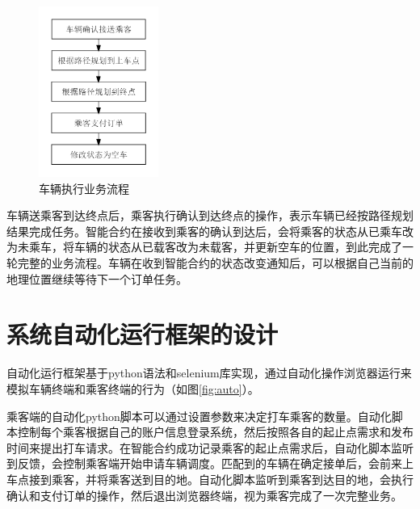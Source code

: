 \begin{figure}
  \centering
  \includegraphics[width=0.35\textwidth]{figures/按导航执行业务}
  \caption{车辆执行业务流程}\label{fig:routing}
\end{figure}

车辆送乘客到达终点后，乘客执行确认到达终点的操作，表示车辆已经按路径规划结果完成任务。智能合约在接收到乘客的确认到达后，会将乘客的状态从已乘车改为未乘车，将车辆的状态从已载客改为未载客，并更新空车的位置，到此完成了一轮完整的业务流程。车辆在收到智能合约的状态改变通知后，可以根据自己当前的地理位置继续等待下一个订单任务。


\section{系统自动化运行框架的设计}
自动化运行框架基于python语法和selenium库实现，通过自动化操作浏览器运行来模拟车辆终端和乘客终端的行为（如图\ref{fig:auto}）。\par

乘客端的自动化python脚本可以通过设置参数来决定打车乘客的数量。自动化脚本控制每个乘客根据自己的账户信息登录系统，然后按照各自的起止点需求和发布时间来提出打车请求。在智能合约成功记录乘客的起止点需求后，自动化脚本监听到反馈，会控制乘客端开始申请车辆调度。匹配到的车辆在确定接单后，会前来上车点接到乘客，并将乘客送到目的地。自动化脚本监听到乘客到达目的地，会执行确认和支付订单的操作，然后退出浏览器终端，视为乘客完成了一次完整业务。\par

